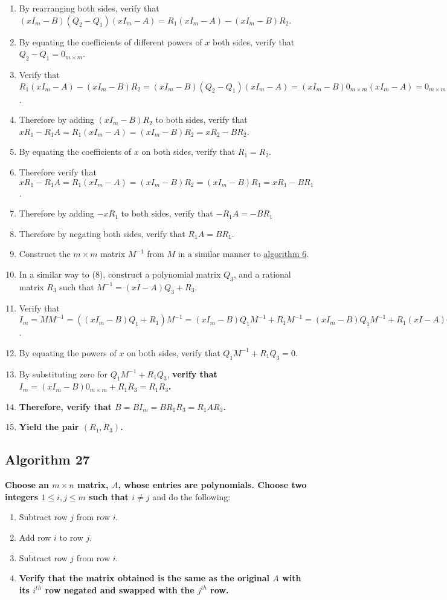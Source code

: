 \documentclass[twocolumn]{article}
\begin{document}
\begin{enumerate}
				\item By rearranging both sides, verify that $(xI_m-B)(Q_2-Q_1)(xI_m-A)=R_1(xI_m-A)-(xI_m-B)R_2$.
				\item By equating the coefficients of different powers of $x$ both sides, verify that $Q_2-Q_1=0_{m\times m}$.
				\item Verify that $R_1(xI_m-A)-(xI_m-B)R_2=(xI_m-B)(Q_2-Q_1)(xI_m-A)=(xI_m-B)0_{m\times m}(xI_m-A)=0_{m\times m}$.
				\item Therefore by adding $(xI_m-B)R_2$ to both sides, verify that $xR_1-R_1A=R_1(xI_m-A)=(xI_m-B)R_2=xR_2-BR_2$.
				\item By equating the coefficients of $x$ on both sides, verify that $R_1=R_2$.
				\item Therefore verify that $xR_1-R_1A=R_1(xI_m-A)=(xI_m-B)R_2=(xI_m-B)R_1=xR_1-BR_1$.
				\item Therefore by adding $-xR_1$ to both sides, verify that $-R_1A=-BR_1$
				\item Therefore by negating both sides, verify that $R_1A=BR_1$.
				\item Construct the $m\times m$ matrix $M^{-1}$ from $M$ in a similar manner to \hyperref[sec:algorithm 6]{algorithm 6}.
				\item In a similar way to (8), construct a polynomial matrix $Q_3$, and a rational matrix $R_3$ such that $M^{-1}=(xI-A)Q_3+R_3$.
				\item Verify that $I_m=MM^{-1}=((xI_m-B)Q_1+R_1)M^{-1}=(xI_m-B)Q_1M^{-1}+R_1M^{-1}=(xI_m-B)Q_1M^{-1}+R_1(xI-A)Q_3+R_1R_3=(xI_m-B)Q_1M^{-1}+(xI-B)R_1Q_3+R_1R_3=(xI_m-B)(Q_1M^{-1}+R_1Q_3)+R_1R_3$.
				\item By equating the powers of $x$ on both sides, verify that $Q_1M^{-1}+R_1Q_3=0$.
				\item By substituting zero for $Q_1M^{-1}+R_1Q_3$, \textbf{verify that $I_m=(xI_m-B)0_{m\times m}+R_1R_3=R_1R_3$.}
				\item \textbf{Therefore, verify that $B=BI_m=BR_1R_3=R_1AR_3$.}
				\item \textbf{Yield the pair $(R_1,R_3)$.}
			\end{enumerate}
		\subsection{Algorithm 27}\label{sec:algorithm 27}
			\textbf{Choose an $m\times n$ matrix, $A$, whose entries are polynomials. Choose two integers $1\le i,j\le m$ such that $i\ne j$} and do the following:
			\begin{enumerate}
				\item Subtract row $j$ from row $i$.
				\item Add row $i$ to row $j$.
				\item Subtract row $j$ from row $i$.
				\item \textbf{Verify that the matrix obtained is the same as the original $A$ with its $i^{th}$ row negated and swapped with the $j^{th}$ row.}
			\end{enumerate}
\end{document}
